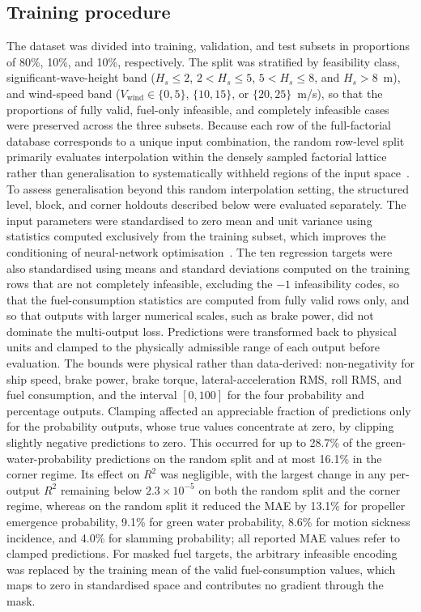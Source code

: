 \documentclass[final,5p,times,twocolumn,numbers]{elsarticle}
\begin{document}
\subsection{Training procedure}
The dataset was divided into training, validation, and test subsets in proportions of 80\%, 10\%, and 10\%, respectively. The split was stratified by feasibility class, significant-wave-height band ($H_s\leq2$, $2<H_s\leq5$, $5<H_s\leq8$, and $H_s>8$~m), and wind-speed band ($V_{\mathrm{wind}}\in\{0,5\}$, $\{10,15\}$, or $\{20,25\}$~m/s), so that the proportions of fully valid, fuel-only infeasible, and completely infeasible cases were preserved across the three subsets. Because each row of the full-factorial database corresponds to a unique input combination, the random row-level split primarily evaluates interpolation within the densely sampled factorial lattice rather than generalisation to systematically withheld regions of the input space~\cite{wang2024extrapolation}. To assess generalisation beyond this random interpolation setting, the structured level, block, and corner holdouts described below were evaluated separately. The input parameters were standardised to zero mean and unit variance using statistics computed exclusively from the training subset, which improves the conditioning of neural-network optimisation~\cite{lecun1998}. The ten regression targets were also standardised using means and standard deviations computed on the training rows that are not completely infeasible, excluding the $-1$ infeasibility codes, so that the fuel-consumption statistics are computed from fully valid rows only, and so that outputs with larger numerical scales, such as brake power, did not dominate the multi-output loss. Predictions were transformed back to physical units and clamped to the physically admissible range of each output before evaluation. The bounds were physical rather than data-derived: non-negativity for ship speed, brake power, brake torque, lateral-acceleration RMS, roll RMS, and fuel consumption, and the interval $[0,100]$ for the four probability and percentage outputs. Clamping affected an appreciable fraction of predictions only for the probability outputs, whose true values concentrate at zero, by clipping slightly negative predictions to zero. This occurred for up to 28.7\% of the green-water-probability predictions on the random split and at most 16.1\% in the corner regime. Its effect on $R^2$ was negligible, with the largest change in any per-output $R^2$ remaining below $2.3\times10^{-5}$ on both the random split and the corner regime, whereas on the random split it reduced the MAE by 13.1\% for propeller emergence probability, 9.1\% for green water probability, 8.6\% for motion sickness incidence, and 4.0\% for slamming probability; all reported MAE values refer to clamped predictions. For masked fuel targets, the arbitrary infeasible encoding was replaced by the training mean of the valid fuel-consumption values, which maps to zero in standardised space and contributes no gradient through the mask.
\end{document}
